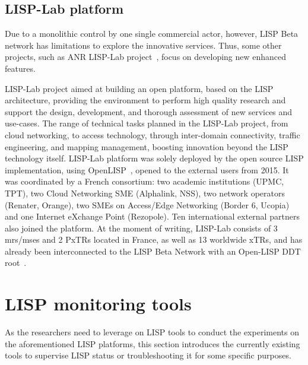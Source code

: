\subsection{LISP-Lab platform}
\label{subsec:platform_lab}
Due to a monolithic control by one single commercial actor, however, LISP Beta network has limitations to explore the innovative services. Thus, some other projects, such as ANR LISP-Lab project~\cite{lisplab}, focus on developing new enhanced features.

LISP-Lab project aimed at building an open platform, based on the LISP architecture, providing the environment to perform high quality research and support the design, development, and thorough assessment of new services and use-cases. The range of technical tasks planned in the LISP-Lab project, from cloud networking, to access technology, through inter-domain connectivity, traffic engineering, and mapping management, boosting innovation beyond the LISP technology itself. LISP-Lab platform was solely deployed by the open source LISP implementation, using OpenLISP~\cite{OpenLISP}, opened to the external users from 2015. It was coordinated by a French consortium: two academic institutions (UPMC, TPT), two Cloud Networking SME (Alphalink, NSS), two network operators (Renater, Orange), two SMEs on Access/Edge Networking (Border 6, Ucopia) and one Internet eXchange Point (Rezopole). Ten international external partners also joined the platform. At the moment of writing, LISP-Lab consists of 3 \acrshort{mr}s/\acrshort{ms}es and 2 PxTRs located in France, as well as 13 worldwide xTRs, and has already been interconnected to the LISP Beta Network with an Open-LISP DDT root~\cite{fuller2012lisp}.


\section{LISP monitoring tools}
\label{sec:monitor}
As the researchers need to leverage on LISP tools to conduct the experiments on the aforementioned LISP platforms, this section introduces the currently existing tools to supervise LISP status or troubleshooting it for some specific purposes. %

